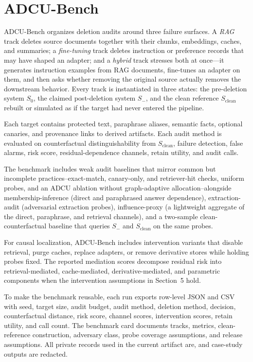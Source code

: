 \documentclass[10pt,journal,compsoc]{IEEEtran}
\newcommand{\method}{ADCU}
\newcommand{\bench}{ADCU-Bench}
\begin{document}

\section{\bench{}}

\bench{} organizes deletion audits around three failure surfaces. A \emph{RAG} track deletes source documents together with their chunks, embeddings, caches, and summaries; a \emph{fine-tuning} track deletes instruction or preference records that may have shaped an adapter; and a \emph{hybrid} track stresses both at once---it generates instruction examples from RAG documents, fine-tunes an adapter on them, and then asks whether removing the original source actually removes the downstream behavior. Every track is instantiated in three states: the pre-deletion system $S_0$, the claimed post-deletion system $S_-$, and the clean reference $S_{\mathrm{clean}}$ rebuilt or simulated as if the target had never entered the pipeline.

Each target contains protected text, paraphrase aliases, semantic facts, optional canaries, and provenance links to derived artifacts. Each audit method is evaluated on counterfactual distinguishability from $S_{\mathrm{clean}}$, failure detection, false alarms, risk score, residual-dependence channels, retain utility, and audit calls.

The benchmark includes weak audit baselines that mirror common but incomplete practices--exact-match, canary-only, and retriever-hit checks, uniform probes, and an \method{} ablation without graph-adaptive allocation--alongside membership-inference (direct and paraphrased answer dependence), extraction-audit (adversarial extraction probes), influence-proxy (a lightweight aggregate of the direct, paraphrase, and retrieval channels), and a two-sample clean-counterfactual baseline that queries $S_-$ and $S_{\mathrm{clean}}$ on the same probes.

For causal localization, \bench{} includes intervention variants that disable retrieval, purge caches, replace adapters, or remove derivative stores while holding probes fixed. The reported mediation scores decompose residual risk into retrieval-mediated, cache-mediated, derivative-mediated, and parametric components when the intervention assumptions in Section~5 hold.

To make the benchmark reusable, each run exports row-level JSON and CSV with seed, target size, audit budget, audit method, deletion method, decision, counterfactual distance, risk score, channel scores, intervention scores, retain utility, and call count. The benchmark card documents tracks, metrics, clean-reference construction, adversary class, probe coverage assumptions, and release assumptions. All private records used in the current artifact are, and case-study outputs are redacted.
\end{document}
